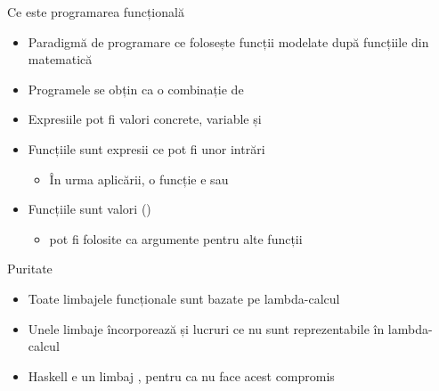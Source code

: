 \documentclass[xcolor=pdftex,romanian,colorlinks]{beamer}
\begin{document}
\begin{frame}{Ce este programarea funcțională}
\protect\hypertarget{ce-este-programarea-funcux21bionalux103}{}

\begin{itemize}

\item
  Paradigmă de programare ce folosește funcții modelate după funcțiile
  din matematică
\item
  Programele se obțin ca o combinație de 
\item
  Expresiile pot fi valori concrete, variable și 
\item
  Funcțiile sunt expresii ce pot fi  unor intrări

  \begin{itemize}
  
  \item
    În urma aplicării, o funcție e  sau 
  \end{itemize}
\item
  Funcțiile sunt valori ()

  \begin{itemize}
  
  \item
    pot fi folosite ca argumente pentru alte funcții
  \end{itemize}
\end{itemize}

\pause

\begin{block}{Puritate}

\begin{itemize}

\item
  Toate limbajele funcționale sunt bazate pe lambda-calcul
\item
  Unele limbaje încorporează și lucruri ce nu sunt reprezentabile în
  lambda-calcul
\item
  Haskell e un limbaj , pentru ca nu face acest compromis
\end{itemize}

\end{block}

\end{frame}
\end{document}
